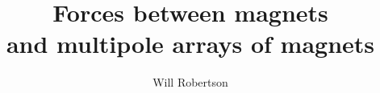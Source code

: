 \documentclass{article}
\begin{document}
\title{Forces between magnets\\ and multipole arrays of magnets}
\author{Will Robertson}
\maketitle
{}
\printbibliography
\end{document}
